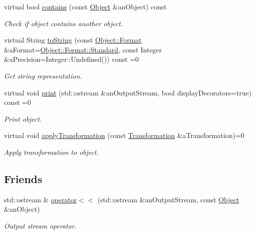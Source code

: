 \begin{DoxyCompactItemize}
virtual bool \hyperlink{classlibrary_1_1math_1_1geom_1_1d2_1_1_object_a7bc14e621db51aec72eff0fa5da295ac}{contains} (const \hyperlink{classlibrary_1_1math_1_1geom_1_1d2_1_1_object}{Object} \&an\+Object) const
\begin{DoxyCompactList}\small\item\em Check if object contains another object. \end{DoxyCompactList}\item 
virtual String \hyperlink{classlibrary_1_1math_1_1geom_1_1d2_1_1_object_acdd76b3637732a249536b609dbe3f0eb}{to\+String} (const \hyperlink{classlibrary_1_1math_1_1geom_1_1d2_1_1_object_ac8cd61dada4960cfee9a469231621b17}{Object\+::\+Format} \&a\+Format=\hyperlink{classlibrary_1_1math_1_1geom_1_1d2_1_1_object_ac8cd61dada4960cfee9a469231621b17aeb6d8ae6f20283755b339c0dc273988b}{Object\+::\+Format\+::\+Standard}, const Integer \&a\+Precision=Integer\+::\+Undefined()) const =0
\begin{DoxyCompactList}\small\item\em Get string representation. \end{DoxyCompactList}\item 
virtual void \hyperlink{classlibrary_1_1math_1_1geom_1_1d2_1_1_object_a834bbf59cf1c483d1dc7b0966b1e1ab3}{print} (std\+::ostream \&an\+Output\+Stream, bool display\+Decorators=true) const =0
\begin{DoxyCompactList}\small\item\em Print object. \end{DoxyCompactList}\item 
virtual void \hyperlink{classlibrary_1_1math_1_1geom_1_1d2_1_1_object_a289589fb6e9e7a2c4ca4976a1544def5}{apply\+Transformation} (const \hyperlink{classlibrary_1_1math_1_1geom_1_1d2_1_1_transformation}{Transformation} \&a\+Transformation)=0
\begin{DoxyCompactList}\small\item\em Apply transformation to object. \end{DoxyCompactList}\end{DoxyCompactItemize}
\subsection*{Friends}
\begin{DoxyCompactItemize}
\item 
std\+::ostream \& \hyperlink{classlibrary_1_1math_1_1geom_1_1d2_1_1_object_a418df9bf4a73078f3d494edef1743f8d}{operator$<$$<$} (std\+::ostream \&an\+Output\+Stream, const \hyperlink{classlibrary_1_1math_1_1geom_1_1d2_1_1_object}{Object} \&an\+Object)
\begin{DoxyCompactList}\small\item\em Output stream operator. \end{DoxyCompactList}\end{DoxyCompactItemize}


